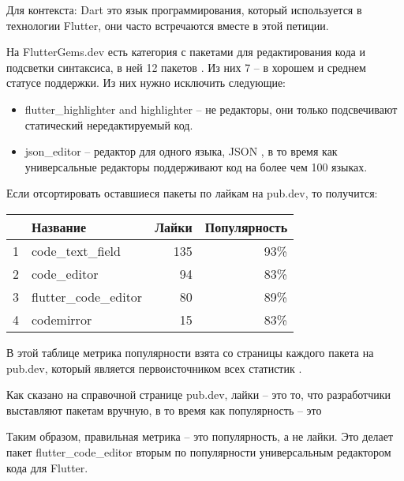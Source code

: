 Для контекста: Dart это язык программирования, который используется в технологии Flutter,
они часто встречаются вместе в этой петиции.

На FlutterGems.dev есть категория с пакетами для редактирования кода и подсветки синтаксиса, в ней 12 пакетов
.
Из них 7 -- в хорошем и среднем статусе поддержки.
Из них нужно исключить следующие:

\begin{itemize}

    \item flutter\_highlighter and highlighter -- не редакторы,
    они только подсвечивают статический нередактируемый код.

    \item json\_editor -- редактор для одного языка, JSON ,
    в то время как универсальные редакторы поддерживают код на более чем 100 языках.

\end{itemize}

Если отсортировать оставшиеся пакеты по лайкам на pub.dev, то получится:

\begin{center}
    \begin{tabular}{|l|l|r|r|}
        \hline
        & Название & Лайки & Популярность\\
        \hline
        1 & code\_text\_field & 135 & 93\%\\
        2 & code\_editor & 94 & 83\%\\
        3 & flutter\_code\_editor & 80 & 89\%\\
        4 & codemirror & 15 & 83\%\\
        \hline
    \end{tabular}
\end{center}

В этой таблице метрика популярности взята со страницы каждого пакета на pub.dev,
который является первоисточником всех статистик .

Как сказано на справочной странице pub.dev, лайки -- это то, что разработчики выставляют пакетам вручную,
в то время как популярность -- это


Таким образом, правильная метрика -- это популярность, а не лайки.
Это делает пакет flutter\_code\_editor вторым по популярности универсальным редактором кода для Flutter.

